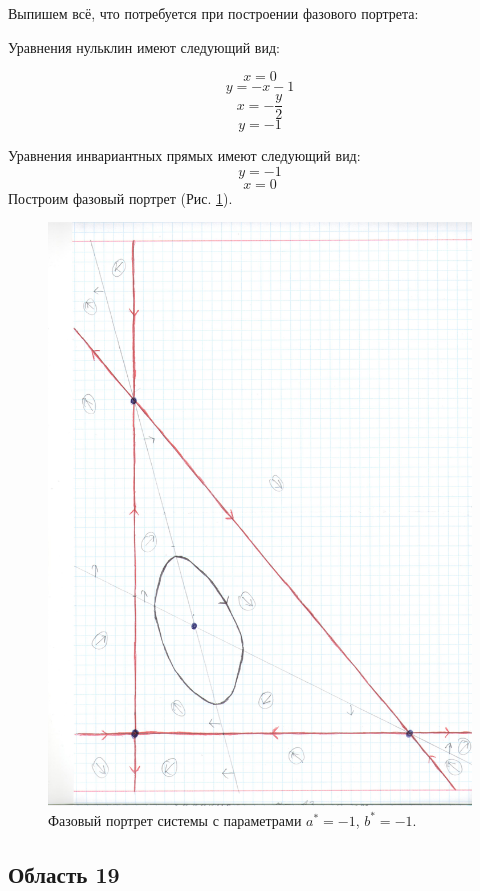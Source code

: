 Выпишем всё, что потребуется при построении фазового портрета:

Уравнения нульклин имеют следующий вид: 

$$x=0$$
$$y=- x - 1$$
$$x=- \frac{y}{2}$$
$$y=-1$$


Уравнения инвариантных прямых имеют следующий вид: 
$$y = -1$$
$$x = 0$$
Построим фазовый портрет (Рис. \ref{fig:phportr18}).

\begin{figure}[h]
	
	\includegraphics[width=\textwidth]{phptr/(-12, -4).jpg}
	\centering
	\caption{\label{fig:phportr18} Фазовый портрет системы с параметрами $a^\ast = -1$, $b^\ast = -1$.}
	
\end{figure}

\subsection{Область 19}

